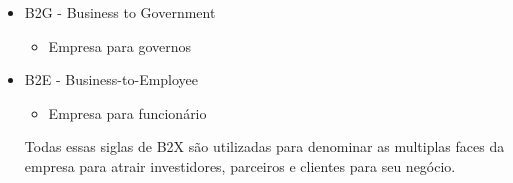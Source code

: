 \documentclass[
	12pt,				%
	openany,			%
	a4paper,			%
	chapter=TITLE,		%
	section=TITLE,		%
	english,
	brazil				%
]{abntex2}
\begin{document}
\begin{itemize}
\item B2G - Business to Government
	\begin{itemize}
		\item[] Empresa para governos
	\end{itemize}

\item B2E - Business-to-Employee
	\begin{itemize}
		\item[] Empresa para funcionário
	\end{itemize}

Todas essas siglas de B2X são utilizadas para denominar as multiplas faces da empresa para atrair investidores, parceiros e clientes para seu negócio.

\end{itemize}
\end{document}
